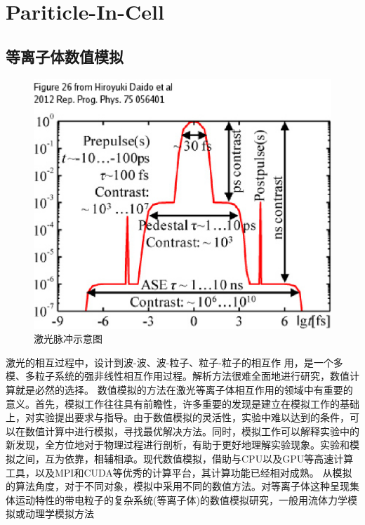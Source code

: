 
\chapter{Pariticle-In-Cell}
\label{chap:pic}

\section{等离子体数值模拟}
\begin{figure}[!htbp]
  \centering
  \includegraphics[width=\MyFactor\textwidth]{Img/prepulse2012.eps}
  \caption{激光脉冲示意图}
  \label{fig:prepulse2012}
\end{figure}

激光的相互过程中，设计到波-波、波-粒子、粒子-粒子的相互作
用，是一个多模、多粒子系统的强非线性相互作用过程。解析方法很难全面地进行研究，数值计算就是必然的选择。
数值模拟的方法在激光等离子体相互作用的领域中有重要的意义。首先，模拟工作往往具有前瞻性，许多重要的发现是建立在模拟工作的基础上，对实验提出要求与指导。由于数值模拟的灵活性，实验中难以达到的条件，可以在数值计算中进行模拟，寻找最优解决方法。同时，模拟工作可以解释实验中的新发现，全方位地对于物理过程进行剖析，有助于更好地理解实验现象。实验和模拟之间，互为依靠，相辅相承。现代数值模拟，借助与CPU以及GPU等高速计算工具，以及MPI和CUDA等优秀的计算平台，其计算功能已经相对成熟。
从模拟的算法角度，对于不同对象，模拟中采用不同的数值方法。对等离子体这种呈现集体运动特性的带电粒子的复杂系统(等离子体)的数值模拟研究，一般用流体力学模拟或动理学模拟方法


